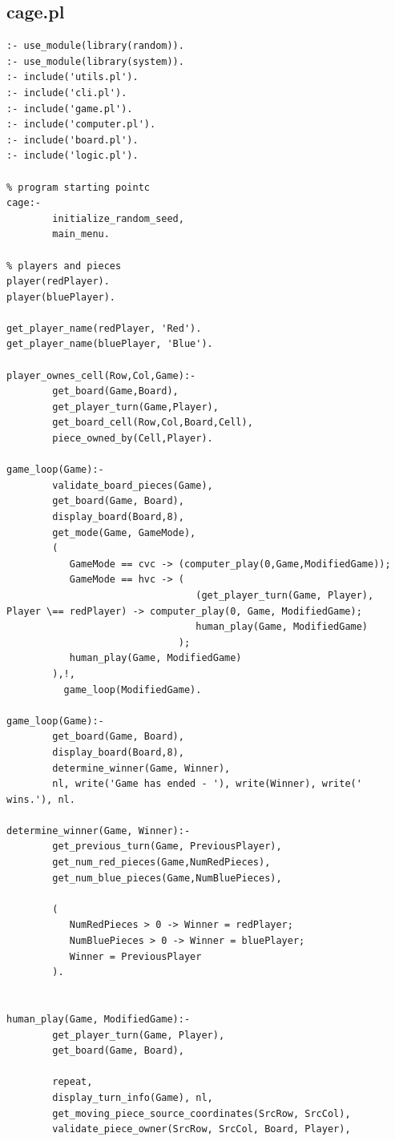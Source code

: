 \documentclass[a4paper]{article}
\begin{document}
\subsection{cage.pl}
\begin{lstlisting}[style=customprologwithlines]
% includes
:- use_module(library(random)).
:- use_module(library(system)).
:- include('utils.pl').
:- include('cli.pl').
:- include('game.pl').
:- include('computer.pl').
:- include('board.pl').
:- include('logic.pl').

% program starting pointc
cage:- 
        initialize_random_seed,
        main_menu.

% players and pieces
player(redPlayer).
player(bluePlayer).

get_player_name(redPlayer, 'Red').
get_player_name(bluePlayer, 'Blue').

player_ownes_cell(Row,Col,Game):-
        get_board(Game,Board),
        get_player_turn(Game,Player),
        get_board_cell(Row,Col,Board,Cell),
        piece_owned_by(Cell,Player).

game_loop(Game):- 
        validate_board_pieces(Game),
        get_board(Game, Board),
        display_board(Board,8),
        get_mode(Game, GameMode),
        (
           GameMode == cvc -> (computer_play(0,Game,ModifiedGame));
           GameMode == hvc -> (
                                 (get_player_turn(Game, Player), Player \== redPlayer) -> computer_play(0, Game, ModifiedGame);
                                 human_play(Game, ModifiedGame)
                              );
           human_play(Game, ModifiedGame)
        ),!,
          game_loop(ModifiedGame).

game_loop(Game):-
        get_board(Game, Board),
        display_board(Board,8),
        determine_winner(Game, Winner),
        nl, write('Game has ended - '), write(Winner), write(' wins.'), nl.

determine_winner(Game, Winner):-
        get_previous_turn(Game, PreviousPlayer),
        get_num_red_pieces(Game,NumRedPieces),
        get_num_blue_pieces(Game,NumBluePieces),

        (
           NumRedPieces > 0 -> Winner = redPlayer;
           NumBluePieces > 0 -> Winner = bluePlayer;
           Winner = PreviousPlayer
        ).


human_play(Game, ModifiedGame):-
        get_player_turn(Game, Player),
        get_board(Game, Board),

        repeat,
        display_turn_info(Game), nl,
        get_moving_piece_source_coordinates(SrcRow, SrcCol), 
        validate_piece_owner(SrcRow, SrcCol, Board, Player),


\end{lstlisting}
\end{document}
